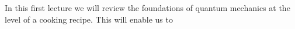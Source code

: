 In this first lecture we will review the foundations of quantum mechanics at the level of a cooking recipe. This will enable us to 